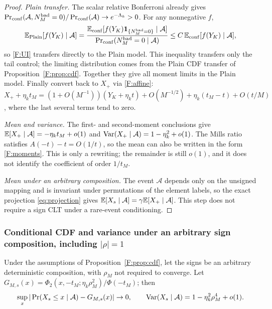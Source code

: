\begin{proof}
\emph{Plain transfer.} The scalar relative Bonferroni already gives
$\Pr_{\rm conf}(\mathcal A,N^{\rm bad}_M=0)/\Pr_{\rm conf}(\mathcal A)\to e^{-\Lambda_k}>0$.
For any nonnegative $f$,
\[
\mathbb E_{\rm Plain}[f(Y_K)\mid \mathcal A]=\frac{\mathbb E_{\rm conf}[f(Y_K)\mathbf1_{\{N^{\rm bad}_M=0\}}\mid \mathcal A]}{\Pr_{\rm conf}(N^{\rm bad}_M=0\mid \mathcal A)}\le C\,\mathbb E_{\rm conf}[f(Y_K)\mid \mathcal A],
\]
so \eqref{F:UI} transfers directly to the Plain model. This inequality transfers only the tail
control; the limiting distribution comes from the Plain CDF transfer of
Proposition~\ref{F:prop:cdf}. Together they give all moment limits in the Plain model. Finally
convert back to $X_+$ via \eqref{F:affine}:
$X_++\eta_kt_M=(1+O(M^{-1}))(Y_K+\eta_kt)+O(M^{-1/2})+\eta_k(t_M-t)+O(t/M)$, where the last
several terms tend to zero.

\emph{Mean and variance.} The first- and second-moment conclusions give
$\mathbb E[X_+\mid \mathcal A]=-\eta_kt_M+o(1)$ and
$\operatorname{Var}(X_+\mid \mathcal A)=1-\eta_k^2+o(1)$. The Mills ratio satisfies $A(-t)-t=O(1/t)$, so the
mean can also be written in the form \eqref{F:moments}. This is only a rewriting; the remainder is
still $o(1)$, and it does not identify the coefficient of order $1/t_M$.

\emph{Mean under an arbitrary composition.} The event $\mathcal A$ depends only on the unsigned
mapping and is invariant under permutations of the element labels, so the exact projection
\eqref{eq:projection} gives $\mathbb E[X_s\mid \mathcal A]=\gamma\mathbb E[X_+\mid \mathcal A]$. This step does
not require a sign CLT under a rare-event conditioning.
\end{proof}

\subsubsection{Conditional CDF and variance under an arbitrary sign composition, including
$|\rho|=1$}

\begin{proposition}\label{F:prop:sign}
Under the assumptions of Proposition~\ref{F:prop:cdf}, let the signs be an arbitrary deterministic
composition, with $\rho_M$ not required to converge. Let
$G_{M,s}(x)=\Phi_2(x,-t_M;\eta_k\rho_M^2)/\Phi(-t_M)$; then
\begin{equation}
\sup_x|\Pr(X_s\le x\mid \mathcal A)-G_{M,s}(x)|\to0,\qquad\operatorname{Var}(X_s\mid \mathcal A)=1-\eta_k^2\rho_M^4+o(1).\label{F:sign}
\end{equation}
\end{proposition}

